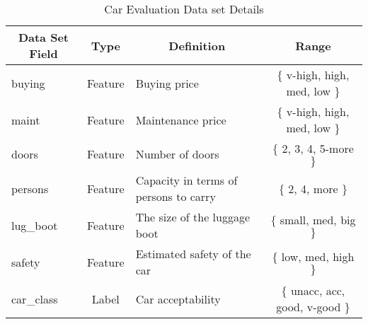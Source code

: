 \begin{table}[H]
\centering
\caption{Car Evaluation Data set Details}
\begin{tabular}{l|c|l|c}
\hline
\multicolumn{1}{c|}{\textbf{Data Set Field}} & \textbf{Type} & \multicolumn{1}{c|}{\textbf{Definition}} & \textbf{Range}           \\ \hline
buying                                       & Feature       & Buying price                             & $\lbrace$ v-high, high, med, low $\rbrace$   \\
maint                                        & Feature       & Maintenance price                        & $\lbrace$ v-high, high, med, low $\rbrace$   \\
doors                                        & Feature       & Number of doors                          & $\lbrace$ 2, 3, 4, 5-more $\rbrace$          \\
persons                                      & Feature       & Capacity in terms of persons to carry    & $\lbrace$ 2, 4, more $\rbrace$               \\
lug\_boot                                    & Feature       & The size of the luggage boot             & $\lbrace$ small, med, big  $\rbrace$         \\
safety                                       & Feature       & Estimated safety of the car              & $\lbrace$ low, med, high $\rbrace$          \\ \hline
car\_class                                   & Label         & Car acceptability                        & $\lbrace$ unacc, acc, good, v-good $\rbrace$ \\ \hline
\end{tabular}
\end{table}